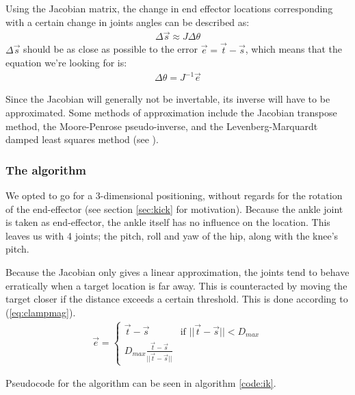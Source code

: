 \documentclass[a4paper]{article}
\begin{document}
Using the Jacobian matrix, the change in end effector locations
corresponding with a certain change in joints angles can be described
as:
\begin{align*}
  \Delta \vec{s} \approx J \Delta \theta
\end{align*}
$\Delta \vec{s}$ should be as close as possible to the error $\vec{e}
= \vec{t} - \vec{s}$, which means that the equation
we're looking for is:
\begin{align*}
  \Delta \theta = J^{-1} \vec{e}
\end{align*}

Since the Jacobian will generally not be invertable, its inverse will
have to be approximated. Some methods of approximation include the
Jacobian transpose method, the Moore-Penrose pseudo-inverse, and the
Levenberg-Marquardt damped least squares method (see \cite{Buss2009}).

\subsubsection{The algorithm}
We opted to go for a 3-dimensional positioning, without regards for the rotation
of the end-effector (see section \ref{sec:kick} for motivation). Because the
ankle joint is taken as end-effector, the ankle itself has no influence on the
location. This leaves us with 4 joints; the pitch, roll and yaw of the hip,
along with the knee's pitch.

Because the Jacobian only gives a linear approximation, the joints
tend to behave erratically when a target location is far away. This is
counteracted by moving the target closer if the distance exceeds a
certain threshold. This is done according to (\ref{eq:clampmag}).
\begin{align}
  \vec{e} = \begin{cases}
    \vec{t} - \vec{s} & \text{if } ||\vec{t} - \vec{s}|| < D_{max} \\
    D_{max} \frac{\vec{t} - \vec{s}}{||\vec{t} - \vec{s}||}
  \end{cases}      \label{eq:clampmag}
\end{align}

Pseudocode for the algorithm can be seen in algorithm \ref{code:ik}.
\end{document}

